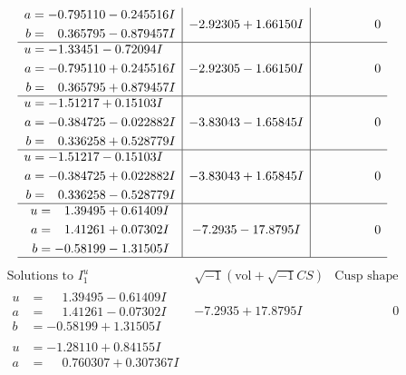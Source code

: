 \documentclass[1p]{elsarticle_modified}
\theoremstyle{definition}
\newcommand{\I}{\sqrt{-1}}
\begin{document}
$$\begin{array}{c|c|c}
\begin{aligned}
a &= -0.795110 - 0.245516 I \\
b &= \phantom{-}0.365795 - 0.879457 I\end{aligned}
 & -2.92305 + 1.66150 I & \phantom{-0.000000 } 0 \\ \hline\begin{aligned}
u &= -1.33451 - 0.72094 I \\
a &= -0.795110 + 0.245516 I \\
b &= \phantom{-}0.365795 + 0.879457 I\end{aligned}
 & -2.92305 - 1.66150 I & \phantom{-0.000000 } 0 \\ \hline\begin{aligned}
u &= -1.51217 + 0.15103 I \\
a &= -0.384725 - 0.022882 I \\
b &= \phantom{-}0.336258 + 0.528779 I\end{aligned}
 & -3.83043 - 1.65845 I & \phantom{-0.000000 } 0 \\ \hline\begin{aligned}
u &= -1.51217 - 0.15103 I \\
a &= -0.384725 + 0.022882 I \\
b &= \phantom{-}0.336258 - 0.528779 I\end{aligned}
 & -3.83043 + 1.65845 I & \phantom{-0.000000 } 0 \\ \hline\begin{aligned}
u &= \phantom{-}1.39495 + 0.61409 I \\
a &= \phantom{-}1.41261 + 0.07302 I \\
b &= -0.58199 - 1.31505 I\end{aligned}
 & -7.2935 - 17.8795 I & \phantom{-0.000000 } 0\\
 \hline 
 \end{array}$$\newpage$$\begin{array}{c|c|c}  
\text{Solutions to }I^u_{1}& \I (\text{vol} + \sqrt{-1}CS) & \text{Cusp shape}\\
 \hline 
\begin{aligned}
u &= \phantom{-}1.39495 - 0.61409 I \\
a &= \phantom{-}1.41261 - 0.07302 I \\
b &= -0.58199 + 1.31505 I\end{aligned}
 & -7.2935 + 17.8795 I & \phantom{-0.000000 } 0 \\ \hline\begin{aligned}
u &= -1.28110 + 0.84155 I \\
a &= \phantom{-}0.760307 + 0.307367 I \\

\end{aligned}
\end{array}$$
\end{document}
